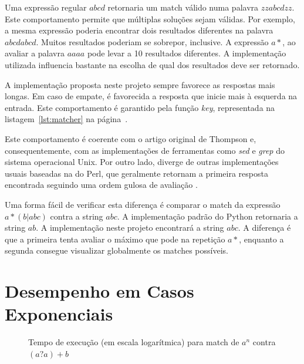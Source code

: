 \documentclass[a4paper,12pt,oneside,onecolumn]{uerj}
\begin{document}
Uma expressão regular $abcd$ retornaria um match válido numa palavra $zzabcdzz$. Este comportamento permite que múltiplas soluções sejam válidas. Por exemplo, a mesma expressão poderia encontrar dois resultados diferentes na palavra $abcdabcd$. Muitos resultados poderiam se sobrepor, inclusive. A expressão $a*$, ao avaliar a palavra $aaaa$ pode levar a 10 resultados diferentes. A implementação utilizada influencia bastante na escolha de qual dos resultados deve ser retornado.

A implementação proposta neste projeto sempre favorece as respostas mais longas. Em caso de empate, é favorecida a resposta que inicie mais à esquerda na entrada. Este comportamento é garantido pela função \emph{key}, representada na listagem~\ref{lst:matcher} na página~\pageref{lst:matcher}.

Este comportamento é coerente com o artigo original de Thompson e, consequentemente, com as implementações de ferramentas como \emph{sed} e \emph{grep} do sistema operacional Unix. Por outro lado, diverge de outras implementações usuais baseadas na do Perl, que geralmente retornam a primeira resposta encontrada seguindo uma ordem gulosa de avaliação \cite{bib:Cox07}.

Uma forma fácil de verificar esta diferença é comparar o match da expressão $a*(b|abc)$ contra a string $abc$. A implementação padrão do Python retornaria a string $ab$. A implementação neste projeto encontrará a string $abc$. A diferença é que a primeira tenta avaliar o máximo que pode na repetição $a*$, enquanto a segunda consegue visualizar globalmente os matches possíveis.

\section{Desempenho em Casos Exponenciais}

\begin{figure}[ht]
\centering
{}
\caption{Tempo de execução (em escala logarítmica) para match de $a^n$ contra $(a?a)+b$}
\label{fig:graph_bench_1}
\end{figure}
\end{document}
